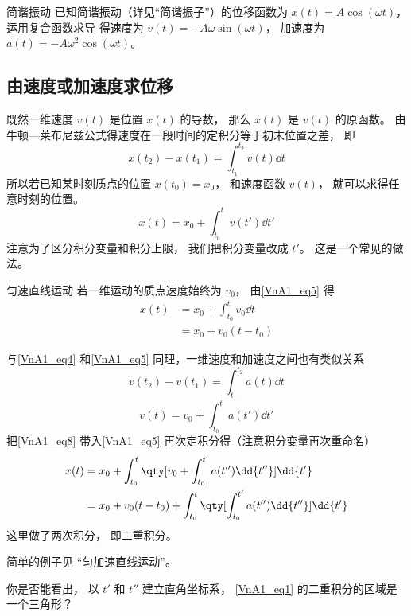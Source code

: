 \begin{example}{简谐振动}
已知简谐振动（详见“简谐振子”）的位移函数为 $x(t) = A\cos(\omega t)$， 运用复合函数求导 得速度为 $v(t) = -A\omega\sin(\omega t)$， 加速度为 $a(t) = -A\omega^2\cos(\omega t)$。
\end{example}

\subsection{由速度或加速度求位移}
既然一维速度 $v(t)$ 是位置 $x(t)$ 的导数， 那么 $x(t)$ 是 $v(t)$ 的原函数。 由牛顿—莱布尼兹公式得速度在一段时间的定积分等于初末位置之差， 即
\begin{equation}\label{VnA1_eq4}
x(t_2) - x(t_1) = \int_{t_1}^{t_2} v(t) \dd{t}
\end{equation}
所以若已知某时刻质点的位置 $x(t_0) = x_0$， 和速度函数 $v(t)$， 就可以求得任意时刻的位置。
\begin{equation}\label{VnA1_eq5}
x(t) = x_0 + \int_{t_0}^t v(t') \dd{t'}
\end{equation}
注意为了区分积分变量和积分上限， 我们把积分变量改成 $t'$。 这是一个常见的做法。

\begin{example}{匀速直线运动}
若一维运动的质点速度始终为 $v_0$， 由\autoref{VnA1_eq5} 得
\begin{equation}
\begin{aligned}
x(t) &= x_0 + \int_{t_0}^t v_0 \dd{t}\\
&= x_0 + v_0(t-t_0)
\end{aligned}
\end{equation}
\end{example}

与\autoref{VnA1_eq4} 和\autoref{VnA1_eq5} 同理，一维速度和加速度之间也有类似关系
\begin{equation}
v(t_2) - v(t_1) = \int_{t_1}^{t_2} a(t) \dd{t}
\end{equation}
\begin{equation}\label{VnA1_eq8}
v(t) = v_0 + \int_{t_0}^t a(t') \dd{t'}
\end{equation}
把\autoref{VnA1_eq8} 带入\autoref{VnA1_eq5} 再次定积分得（注意积分变量再次重命名）
\begin{equation}\label{VnA1_eq2}
\begin{aligned}
x(t) &= x_0 + \int_{t_0}^t  \qty[v_0 + \int_{t_0}^{t'} a(t'') \dd{t''}] \dd{t'}\\
&= x_0 + v_0 (t - t_0) + \int_{t_0}^t \qty[\int_{t_0}^{t'} a(t'') \dd{t''}] \dd{t'}\\
\end{aligned}
\end{equation}
这里做了两次积分， 即二重积分。

简单的例子见 “匀加速直线运动”。

\begin{exercise}{}
你是否能看出， 以 $t'$ 和 $t''$ 建立直角坐标系， \autoref{VnA1_eq1} 的二重积分的区域是一个三角形？
\end{exercise}
